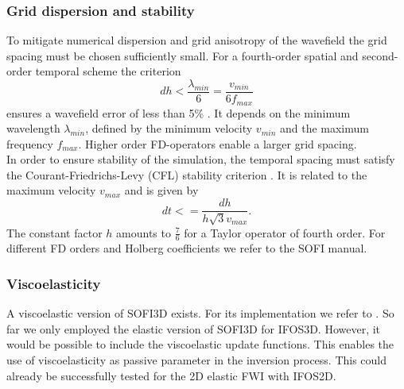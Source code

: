 \subsubsection*{Grid dispersion and stability} 
To mitigate numerical dispersion and grid anisotropy of the wavefield the grid spacing must be chosen sufficiently small. For a fourth-order spatial and second-order temporal scheme the criterion 
\begin{equation}
 dh < \frac{\lambda_{min}}{6}=\frac{v_{min}}{6f_{max}} \label{equ:grid_disp}
\end{equation}
ensures a wavefield error of less than 5\% \citep{boh02}. It depends on the minimum wavelength $\lambda_{min}$, defined by the minimum velocity $v_{min}$ and the maximum frequency $f_{max}$.  Higher order FD-operators enable a larger grid spacing.\\
In order to ensure stability of the simulation, the temporal spacing must satisfy the Courant-Friedrichs-Levy (CFL) stability criterion \citep{Cou67}. It is related to the maximum velocity $v_{max}$ and is given by
\begin{equation}
 dt<=\frac{dh}{h\sqrt{3}v_{max}}.
\end{equation}
The constant factor $h$ amounts to $\frac{7}{6}$ for a Taylor operator of fourth order. For different FD orders and Holberg coefficients we refer to the SOFI manual.
\subsubsection*{Viscoelasticity}
A viscoelastic version of SOFI3D exists. For its implementation we refer to \cite{boh02}. So far we only employed the elastic version of SOFI3D for IFOS3D. However, it would be possible to include the viscoelastic update functions. This enables the use of viscoelasticity as passive parameter in the inversion process. This could already be successfully tested for the 2D elastic FWI with IFOS2D.	
